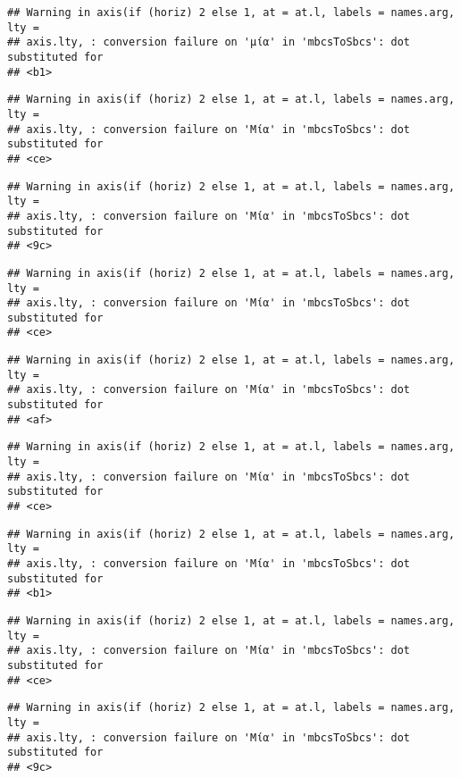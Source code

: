 \documentclass[
]{article}
\begin{document}
\begin{verbatim}
## Warning in axis(if (horiz) 2 else 1, at = at.l, labels = names.arg, lty =
## axis.lty, : conversion failure on 'μία' in 'mbcsToSbcs': dot substituted for
## <b1>
\end{verbatim}

\begin{verbatim}
## Warning in axis(if (horiz) 2 else 1, at = at.l, labels = names.arg, lty =
## axis.lty, : conversion failure on 'Μία' in 'mbcsToSbcs': dot substituted for
## <ce>
\end{verbatim}

\begin{verbatim}
## Warning in axis(if (horiz) 2 else 1, at = at.l, labels = names.arg, lty =
## axis.lty, : conversion failure on 'Μία' in 'mbcsToSbcs': dot substituted for
## <9c>
\end{verbatim}

\begin{verbatim}
## Warning in axis(if (horiz) 2 else 1, at = at.l, labels = names.arg, lty =
## axis.lty, : conversion failure on 'Μία' in 'mbcsToSbcs': dot substituted for
## <ce>
\end{verbatim}

\begin{verbatim}
## Warning in axis(if (horiz) 2 else 1, at = at.l, labels = names.arg, lty =
## axis.lty, : conversion failure on 'Μία' in 'mbcsToSbcs': dot substituted for
## <af>
\end{verbatim}

\begin{verbatim}
## Warning in axis(if (horiz) 2 else 1, at = at.l, labels = names.arg, lty =
## axis.lty, : conversion failure on 'Μία' in 'mbcsToSbcs': dot substituted for
## <ce>
\end{verbatim}

\begin{verbatim}
## Warning in axis(if (horiz) 2 else 1, at = at.l, labels = names.arg, lty =
## axis.lty, : conversion failure on 'Μία' in 'mbcsToSbcs': dot substituted for
## <b1>
\end{verbatim}

\begin{verbatim}
## Warning in axis(if (horiz) 2 else 1, at = at.l, labels = names.arg, lty =
## axis.lty, : conversion failure on 'Μία' in 'mbcsToSbcs': dot substituted for
## <ce>
\end{verbatim}

\begin{verbatim}
## Warning in axis(if (horiz) 2 else 1, at = at.l, labels = names.arg, lty =
## axis.lty, : conversion failure on 'Μία' in 'mbcsToSbcs': dot substituted for
## <9c>
\end{verbatim}
\end{document}
